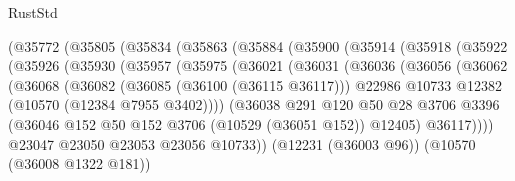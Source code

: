 \begin{lexlean}{RustStd}
\begin{coremodule}
                  (@35772
                    (@35805
                      (@35834
                        (@35863
                          (@35884
                            (@35900
                              (@35914
                                (@35918
                                  (@35922
                                    (@35926
                                      (@35930
                                        (@35957
                                          (@35975
                                            (@36021
                                              (@36031
                                                (@36036
                                                  (@36056
                                                    (@36062
                                                      (@36068
                                                        (@36082
                                                          (@36085 (@36100 (@36115 @36117)))
                                                          @22986
                                                          @10733
                                                          @12382
                                                          (@10570 (@12384 @7955 @3402))))
                                                      (@36038
                                                        @291
                                                        @120
                                                        @50
                                                        @28
                                                        @3706
                                                        @3396
                                                        (@36046
                                                          @152
                                                          @50
                                                          @152
                                                          @3706
                                                          (@10529 (@36051 @152))
                                                          @12405)
                                                        @36117))))
                                                @23047
                                                @23050
                                                @23053
                                                @23056
                                                @10733))
                                            (@12231 (@36003 @96))
                                            (@10570 (@36008 @1322 @181))

\end{coremodule}
\end{lexlean}
